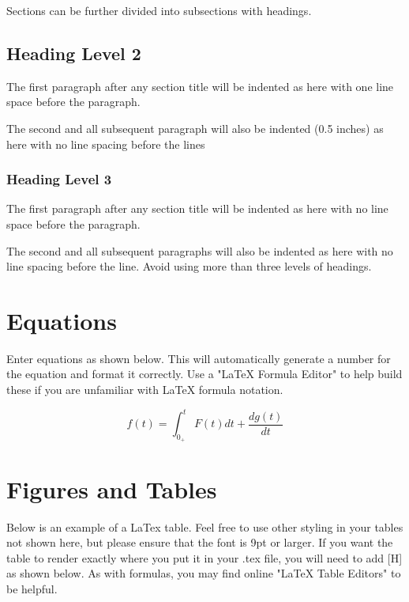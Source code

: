 \documentclass[10pt, fleqn]{article}
\begin{document}
Sections can be further divided into subsections with headings.  


\subsection{Heading Level 2}

The first  paragraph after any section title will be indented as here with one line space before the paragraph.

The second and all subsequent paragraph will also be indented (0.5 inches) as here with no line spacing before the lines


\subsubsection{Heading Level 3}
The first paragraph after any section title will be indented as here with no line space before the paragraph.

The second and all subsequent paragraphs will also be indented as here with no line spacing before the line. Avoid using more than three levels of headings.

\section{Equations}

Enter equations as shown below.  This will automatically generate a number for the equation and format it correctly.  Use a "LaTeX Formula Editor" to help build these if you are unfamiliar with LaTeX formula notation.

\begin{equation}
f(t) = \int_{0_+}^{t}F(t)dt+\frac{dg(t)}{dt}
\end{equation}


\section{Figures and Tables}
Below is an example of a LaTex table.  Feel free to use other styling in your tables not shown here, but please ensure that the font is 9pt or larger.  If you want the table to render exactly where you put it in your .tex file, you will need to add [H] as shown below.  As with formulas, you may find online "LaTeX Table Editors" to be helpful.
\end{document}
